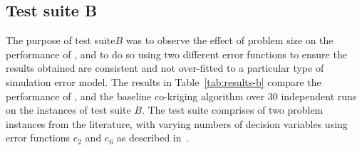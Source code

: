 \subsection*{Test suite B}
The purpose of test suite$B$ was to observe the effect of problem size on the performance of \AlgName{}, and to do so using two different error functions to ensure the results obtained are consistent and not over-fitted to a particular type of simulation error model. The results in Table~\ref{tab:results-b} compare the performance of \AlgName{}, \motos{} and the baseline co-kriging algorithm over 30 independent runs on the instances of test suite $B$. The test suite comprises of two problem instances from the literature, with varying numbers of decision variables using error functions $e_2$ and $e_6$ as described in~\cite{wang2017generic}.

